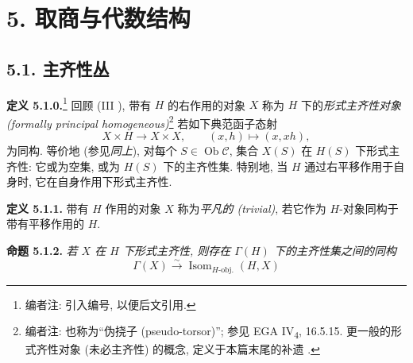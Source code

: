
\setcounter{footnote}{47}

\section*{5. 取商与代数结构}

\subsection*{5.1. 主齐性丛}

\noindent{}\textbf{定义 5.1.0.}\footnote{编者注: 引入编号, 以便后文引用.}
回顾 (III ), 带有
\(H\) 的右作用的对象 \(X\) 称为 \(H\) 下的\emph{形式主齐性对象 (formally principal homogeneous)}\footnote{编者注: 也称为``伪挠子 (pseudo-torsor)''; 参见 EGA IV\textsubscript{4}, 16.5.15.
更一般的形式齐性对象 (未必主齐性) 的概念, 定义于本篇末尾的补遗
.} 若如下典范函子态射
\[
  X\times H\longrightarrow X\times X,
  \qquad (x,h)\longmapsto(x,xh),
\]
为同构. 等价地 (参见\emph{同上}), 对每个
\(S\in\operatorname{Ob}\mathscr C\), 集合 \(X(S)\) 在 \(H(S)\) 下形式主齐性:
它或为空集, 或为 \(H(S)\) 下的主齐性集.
特别地, 当 \(H\) 通过右平移作用于自身时, 它在自身作用下形式主齐性.

\medskip
\noindent{}\textbf{定义 5.1.1.}
带有 \(H\) 作用的对象 \(X\) 称为\emph{平凡的 (trivial)},
若它作为 \(H\)-对象同构于带有平移作用的 \(H\).

\medskip
\noindent{}\textbf{命题 5.1.2.}
\textit{若 \(X\) 在 \(H\) 下形式主齐性, 则存在
\(\Gamma(H)\) 下的主齐性集之间的同构}
\[
  \Gamma(X)\xrightarrow{\sim}
  \operatorname{Isom}_{H\text{-obj.}}(H,X)
\]
\textit{}

